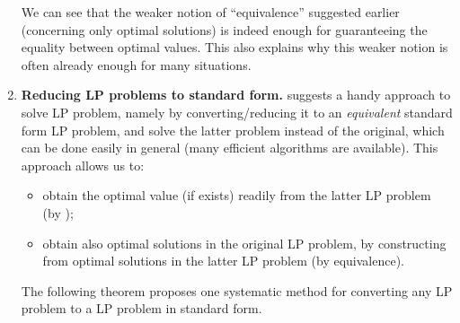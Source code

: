 \begin{enumerate}
\begin{pf}
\end{pf}

\begin{note}
We can see that the weaker notion of ``equivalence'' suggested earlier
(concerning only optimal solutions) is indeed enough for guaranteeing the
equality between optimal values.  This also explains why this weaker notion is
often already enough for many situations.
\end{note}
\item\label{it:reduce-to-std-form} \textbf{Reducing LP problems to standard form.}
 suggests a handy approach to solve LP problem,
namely by converting/reducing it to an \emph{equivalent} standard form LP
problem, and solve the latter problem instead of the original, which can be
done easily in general (many efficient algorithms are available). This approach
allows us to:
\begin{itemize}
\item obtain the optimal value (if exists) readily from the latter LP problem
(by );
\item obtain also optimal solutions in the original LP problem, by constructing
from optimal solutions in the latter LP problem (by equivalence).
\end{itemize}

\begin{center}
\end{center}
The following theorem proposes one systematic method for converting any LP
problem to a LP problem in standard form.


\end{enumerate}
